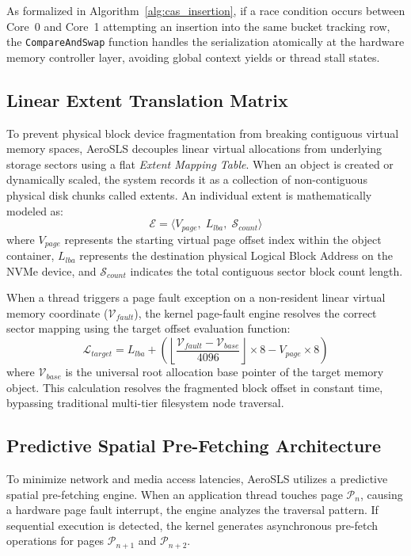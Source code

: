 \documentclass[sigconf]{acmart}
\begin{document}
As formalized in Algorithm~\ref{alg:cas_insertion}, if a race
condition occurs between Core~0 and Core~1 attempting an
insertion into the same bucket tracking row, the
\texttt{CompareAndSwap} function handles the serialization
atomically at the hardware memory controller layer, avoiding
global context yields or thread stall states.

\subsection{Linear Extent Translation Matrix}
To prevent physical block device fragmentation from breaking
contiguous virtual memory spaces, AeroSLS decouples linear
virtual allocations from underlying storage sectors using a flat
\textit{Extent Mapping Table}.  When an object is created or
dynamically scaled, the system records it as a collection of
non-contiguous physical disk chunks called extents.  An
individual extent is mathematically modeled as:
\begin{equation}
\mathcal{E} = \langle V_{page},\; L_{lba},\; \mathcal{S}_{count}
  \rangle
\end{equation}
where $V_{page}$ represents the starting virtual page offset
index within the object container, $L_{lba}$ represents the
destination physical Logical Block Address on the NVMe device,
and $\mathcal{S}_{count}$ indicates the total contiguous sector
block count length.

When a thread triggers a page fault exception on a non-resident
linear virtual memory coordinate ($\mathcal{V}_{fault}$), the
kernel page-fault engine resolves the correct sector mapping
using the target offset evaluation function:
\begin{equation}
\mathcal{L}_{target} = L_{lba} + \!\left(
  \left\lfloor \frac{\mathcal{V}_{fault} -
  \mathcal{V}_{base}}{4096} \right\rfloor \times 8 -
  V_{page} \times 8
\right)
\end{equation}
where $\mathcal{V}_{base}$ is the universal root allocation base
pointer of the target memory object.  This calculation resolves
the fragmented block offset in constant time, bypassing
traditional multi-tier filesystem node traversal.

\subsection{Predictive Spatial Pre-Fetching Architecture}
To minimize network and media access latencies, AeroSLS utilizes
a predictive spatial pre-fetching engine.  When an application
thread touches page $\mathcal{P}_{n}$, causing a hardware page
fault interrupt, the engine analyzes the traversal pattern.  If
sequential execution is detected, the kernel generates
asynchronous pre-fetch operations for pages $\mathcal{P}_{n+1}$
and $\mathcal{P}_{n+2}$.
\end{document}
